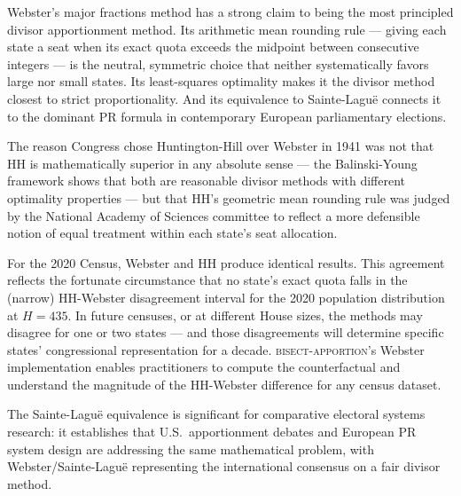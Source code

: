 Webster's major fractions method has a strong claim to being the
most principled divisor apportionment method.
Its arithmetic mean rounding rule --- giving each state a seat
when its exact quota exceeds the midpoint between consecutive
integers --- is the neutral, symmetric choice that neither
systematically favors large nor small states.
Its least-squares optimality makes it the divisor method closest
to strict proportionality.
And its equivalence to Sainte-Lagu\"e connects it to the dominant
PR formula in contemporary European parliamentary elections.

The reason Congress chose Huntington-Hill over Webster in 1941 was
not that HH is mathematically superior in any absolute sense ---
the Balinski-Young framework shows that both are reasonable divisor
methods with different optimality properties --- but that HH's
geometric mean rounding rule was judged by the National Academy of
Sciences committee to reflect a more defensible notion of equal
treatment within each state's seat allocation.

For the 2020 Census, Webster and HH produce identical results.
This agreement reflects the fortunate circumstance that no state's
exact quota falls in the (narrow) HH-Webster disagreement interval
for the 2020 population distribution at $H = 435$.
In future censuses, or at different House sizes, the methods may
disagree for one or two states --- and those disagreements will
determine specific states' congressional representation for a decade.
\textsc{bisect-apportion}'s Webster implementation enables practitioners
to compute the counterfactual and understand the magnitude of the
HH-Webster difference for any census dataset.

The Sainte-Lagu\"e equivalence is significant for comparative
electoral systems research: it establishes that U.S.\ apportionment
debates and European PR system design are addressing the same
mathematical problem, with Webster/Sainte-Lagu\"e representing
the international consensus on a fair divisor method.
